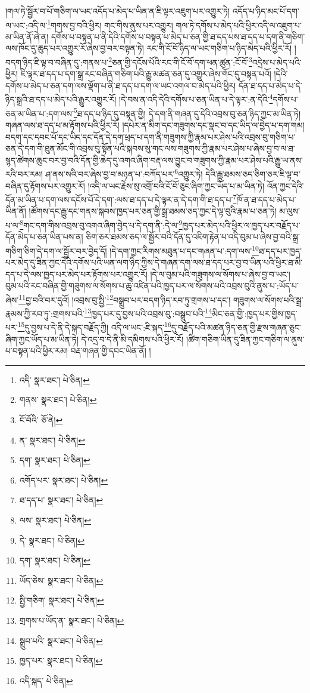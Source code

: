 །གལ་ཏེ་སྦྱོར་བ་པོ་གཅིག་ལ་ཡང་འདོད་པ་མེད་པ་ཡིན་ན་ཇི་ལྟར་འཇུག་པར་འགྱུར་ཏེ། འདོད་པ་ཉིད་མང་པོ་དག་ལ་ཡང་:འདི་ལ་\footnote{འདི་  སྣར་ཐང་།  པེ་ཅིན། }གགས་བྱ་བའི་ཕྱིར། གང་གིས་ནུས་པར་འགྱུར། གལ་ཏེ་དགོས་པ་མེད་པའི་ཕྱིར་འདི་ལ་འཇུག་པ་མ་ཡིན་ནོ་ཞེ་ན། དགོས་པ་བསྟན་པ་ནི་དེའི་དགོས་པ་བསྟན་པ་མེད་པ་ཅན་གྱི་ཐ་དད་པས་ཐ་དད་པ་དག་ནི་གཅིག་ལས་ཁོང་དུ་ཆུད་པར་འགྱུར་རོ་ཞེས་བྱ་བར་བསྟན་ཏེ། རང་གི་ངོ་བོ་ཉིད་ལ་ཡང་གཅིག་པ་ཉིད་མེད་པའི་ཕྱིར་རོ། །བདག་ཉིད་ཇི་ལྟ་བ་བཞིན་དུ་:གནས་པ་\footnote{གནས་  སྣར་ཐང་།  པེ་ཅིན། }ཅན་གྱི་དངོས་པོའི་རང་གི་ངོ་བོ་དག་ཕན་ཚུན་:ངོ་བོ་\footnote{ངོ་བོའི་  ཅོ་ནེ། }འདྲེས་པ་མེད་པའི་ཕྱིར། ཇི་ལྟར་ཐ་དད་པ་དག་སྒྲ་རང་བཞིན་གཅིག་པའི་རྒྱུ་མཚན་ཅན་དུ་འགྱུར་ཞེས་གོང་དུ་བསྟན་པའོ། །དེའི་དགོས་པ་མེད་པ་ཅན་དག་ལས་ལྡོག་པ་ནི་ཐ་དད་པ་དག་ལ་ཡང་འགལ་བ་མེད་པའི་ཕྱིར། དོན་ཐ་དད་པ་མེད་པ་དེ་ཉིད་སྒྲའི་ཐ་དད་པ་མེད་པའི་རྒྱུར་འགྱུར་རོ། །དེ་བས་ན་འདི་དེའི་དགོས་པ་ཅན་ཡིན་པ་དེ་ལྟར་:ན་དེའི་\footnote{ན་  སྣར་ཐང་།  པེ་ཅིན། }དགོས་པ་ཅན་མ་ཡིན་པ་:དག་ལས་\footnote{དག་  སྣར་ཐང་།  པེ་ཅིན། }ཐ་དད་པ་ཉིད་དུ་བསྟན་གྱི། དེ་དག་ནི་གཞན་དུ་དེའི་འབྲས་བུ་ཅན་ཉིད་ཀྱང་མ་ཡིན་ཏེ། གཞན་ལས་ཐ་དད་པ་མ་རྟོགས་པའི་ཕྱིར་རོ། །དཔེར་ན་མིག་དང་གཟུགས་དང་སྣང་བ་དང་ཡིད་ལ་བྱེད་པ་དག་གམ། བདག་དང་དབང་པོ་དང་ཡིད་དང་དོན་དེ་དག་ཕྲད་པ་དག་ནི་གཟུགས་ཀྱི་རྣམ་པར་ཤེས་པའི་འབྲས་བུ་གཅིག་པ་ཅན་དེ་དག་གི་ཐུན་མོང་གི་འབྲས་བུ་སྟོན་པའི་སྐབས་སུ་གང་ལས་གཟུགས་ཀྱི་རྣམ་པར་ཤེས་པ་ཞེས་བྱ་བ་ལ་ཐ་སྙད་ཚེགས་ཆུང་བར་བྱ་བའི་དོན་གྱི་ཆེད་དུ་འགའ་ཞིག་བརྡ་ལས་བྱུང་བ་གཟུགས་ཀྱི་རྣམ་པར་ཤེས་པའི་རྒྱུ་ཡ་ནས་རའི་བར་རམ། ཤ་ནས་སའི་བར་ཞེས་བྱ་བ་མཉན་པ་:བཀོད་པར་\footnote{འགོད་པར་  སྣར་ཐང་།  པེ་ཅིན། }འགྱུར་ཏེ། དེའི་རྒྱུ་ཐམས་ཅད་ཅིག་ཅར་ཇི་ལྟ་བ་བཞིན་དུ་རྟོགས་པར་འགྱུར་རོ། །འདི་ལ་ཡང་རྗེས་སུ་འགྲོ་བའི་ངོ་བོ་ཅུང་ཞིག་ཀྱང་ཡོད་པ་མ་ཡིན་ཏེ། འོན་ཀྱང་དེའི་དོན་མ་ཡིན་པ་དག་ལས་དངོས་པོ་དེ་དག་:ལས་ཐ་དད་པ་དེ་ལྟར་ན་དེ་དག་གི་ཐ་དད་པ་\footnote{ཐ་དད་པ་  སྣར་ཐང་།  པེ་ཅིན། }ཁོ་ན་ཐ་དད་པ་མེད་པ་ཡིན་ནོ། །ཚོགས་དང་རྒྱུ་དང་གནས་སྐབས་ཁྱད་པར་ཅན་གྱི་སྒྲ་ཐམས་ཅད་ཀྱང་དེ་ལྟ་བུའི་རྣམ་པ་ཅན་ཏེ། མ་ལུས་པ་ལ་\footnote{ལས་  སྣར་ཐང་།  པེ་ཅིན། }གང་དག་གིས་འབྲས་བུ་འགའ་ཞིག་བྱེད་པ་དེ་དག་ནི་:དེ་ལ་\footnote{དེ་  སྣར་ཐང་།  པེ་ཅིན། }ཁྱད་པར་མེད་པའི་ཕྱིར་ལ་ཁྱད་པར་བརྗོད་པ་དོན་མེད་པ་ཅན་ཡིན་པས་ན། ཅིག་ཅར་ཐམས་ཅད་ལ་སྦྱོར་བའི་དོན་དུ་འཇིག་རྟེན་པ་འདི་བུམ་པ་ཞེས་བྱ་བའི་སྒྲ་གཅིག་ཅིག་དེ་དག་ལ་སྦྱོར་བར་བྱེད་དོ། །དེ་དག་ཀྱང་རིགས་མཐུན་པ་དང་གཞན་པ་:དག་ལས་\footnote{དག་  སྣར་ཐང་།  པེ་ཅིན། }ཐ་དད་པར་ཁྱད་པར་མེད་དུ་ཟིན་ཀྱང་དེའི་དགོས་པའི་ཡན་ལག་ཉིད་ཀྱིས་དེ་གཞན་དག་ལས་ཐ་དད་པར་བྱ་བ་ཡིན་པའི་ཕྱིར་ཐ་མི་དད་པ་དེ་ལས་ཁྱད་པར་མེད་པར་རྟོགས་པར་འགྱུར་རོ། །དེ་ལ་བུམ་པའི་གཟུགས་ལ་སོགས་པ་ཞེས་བྱ་བ་ཡང་། བུམ་པའི་རང་བཞིན་གྱི་གཟུགས་ལ་སོགས་པ་ཆུ་འཛིན་པའི་ཁྱད་པར་ལ་སོགས་པའི་འབྲས་བུའི་ནུས་པ་:ཡོད་པ་ཞེས་\footnote{ཡོད་ཅེས་  སྣར་ཐང་།  པེ་ཅིན། }བྱ་བའི་བར་དུའོ། །འབྲས་བུ་སྤྱི་\footnote{སྤྱི་གཅིག་  སྣར་ཐང་།  པེ་ཅིན། }བསྒྲུབ་པར་བདག་ཉིད་རབ་ཏུ་གྲགས་པ་དང་། གཟུགས་ལ་སོགས་པའི་སྒྲ་རྣམས་ཀྱི་རབ་ཏུ་:གྲགས་པའི་\footnote{གྲགས་པ་ཡོད་ན་  སྣར་ཐང་།  པེ་ཅིན། }ཁྱད་པར་དུ་བྱས་པའི་འབྲས་བུ་:བསྒྲུབ་པའི་\footnote{སྒྲུབ་པའི་  སྣར་ཐང་།  པེ་ཅིན། }མིང་ཅན་གྱི་:ཁྱད་པར་གྱིས་ཁྱད་པར་\footnote{ཁྱད་པར་  སྣར་ཐང་།  པེ་ཅིན། }དུ་བྱས་པ་དེ་ནི་དེ་སྐད་བརྗོད་ཀྱི། འདི་ལ་ཡང་:ཇི་སྐད་\footnote{འདི་སྐད་  པེ་ཅིན། }དུ་བརྗོད་པའི་མཚན་ཉིད་ཅན་གྱི་རྫས་གཞན་ཅུང་ཞིག་ཀྱང་ཡོད་པ་མ་ཡིན་ཏེ། དེ་འདྲ་བ་དེ་ནི་མི་དམིགས་པའི་ཕྱིར་རོ། །ཚིག་གཅིག་ཡིན་དུ་ཟིན་ཀྱང་གཅིག་ལ་ནུས་པ་བསྟན་པའི་ཕྱིར་རམ། བརྡ་གཞན་གྱི་དབང་ཡིན་ནོ། །
